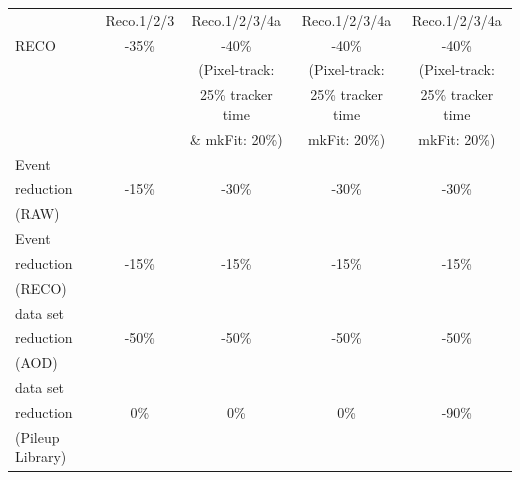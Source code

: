 \begin{table}[tbph]
\begin{tabular}{|l|c|c|c|c|}
    \cellcolor{tablerowheader}                  &   Reco.1/2/3     &  Reco.1/2/3/4a          &  Reco.1/2/3/4a          &  Reco.1/2/3/4a  \\ 
    \cellcolor{tablerowheader} RECO       &   -35\%          &  -40\%                  &  -40\%                  &  -40\%   \\ 
    \cellcolor{tablerowheader}                  &                  &  (Pixel-track:          &  (Pixel-track:          &  (Pixel-track:   \\
    \cellcolor{tablerowheader}                  &                  &  25\% tracker time      &   25\% tracker time     &   25\% tracker time\\  
    \cellcolor{tablerowheader}                  &                  & \& mkFit: 20\%)         &   mkFit: 20\%)          &   mkFit: 20\%)  \\  \hline
    
    \cellcolor{tablerowheader} Event            &                  &                         &                         &  \\
    \cellcolor{tablerowheader} reduction        &   -15\%          &  -30\%                  &  -30\%                  &  -30\%   \\
    \cellcolor{tablerowheader} (RAW)      &                  &                         &                         & \\ \hline
    
    \cellcolor{tablerowheader} Event            &                  &                         &                         & \\ 
    \cellcolor{tablerowheader} reduction        &   -15\%          &  -15\%                  & -15\%                   &  -15\%   \\ 
    \cellcolor{tablerowheader} (RECO)     &                  &                         &                         &  \\ 
    \hline

    \cellcolor{tablerowheader} data set          &                  &                         &                         & \\ 
    \cellcolor{tablerowheader} reduction        &   -50\%          &  -50\%                  & -50\%                   &  -50\%   \\ 
    \cellcolor{tablerowheader} (AOD)      &                  &                         &                         &  \\ 
    \hline

    \cellcolor{tablerowheader} data set          &                  &                         &                         & \\ 
    \cellcolor{tablerowheader} reduction        &   0\%            &  0\%                    & 0\%                     &  -90\%   \\ 
    \cellcolor{tablerowheader} (Pileup Library) &                  &                         &                         &  \\ 
    \hline
    

\end{tabular}
\end{table}
